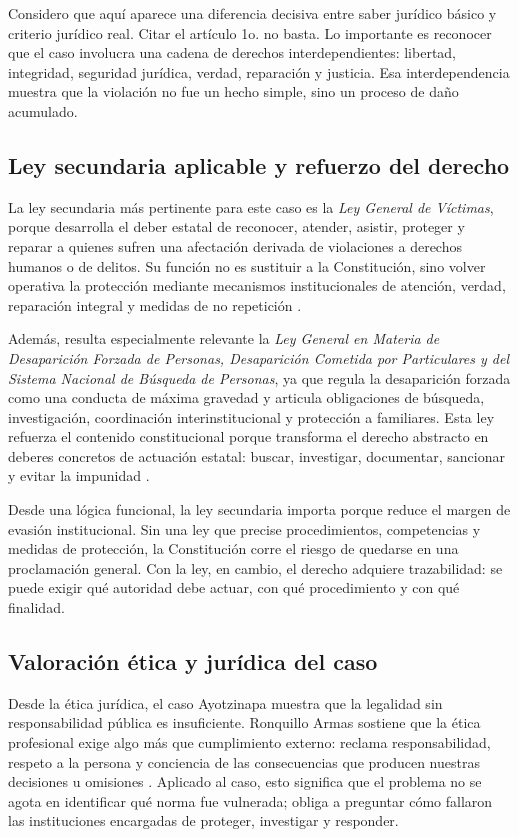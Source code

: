 \documentclass[
	spanish,
	letterpaper, oneside
]{article}
\begin{document}
Considero que aquí aparece una diferencia decisiva entre saber jurídico básico y criterio jurídico real. Citar el artículo 1o. no basta. Lo importante es reconocer que el caso involucra una cadena de derechos interdependientes: libertad, integridad, seguridad jurídica, verdad, reparación y justicia. Esa interdependencia muestra que la violación no fue un hecho simple, sino un proceso de daño acumulado.

\subsection{Ley secundaria aplicable y refuerzo del derecho}

La ley secundaria más pertinente para este caso es la \textit{Ley General de Víctimas}, porque desarrolla el deber estatal de reconocer, atender, asistir, proteger y reparar a quienes sufren una afectación derivada de violaciones a derechos humanos o de delitos. Su función no es sustituir a la Constitución, sino volver operativa la protección mediante mecanismos institucionales de atención, verdad, reparación integral y medidas de no repetición \citep{lgv2026}.

Además, resulta especialmente relevante la \textit{Ley General en Materia de Desaparición Forzada de Personas, Desaparición Cometida por Particulares y del Sistema Nacional de Búsqueda de Personas}, ya que regula la desaparición forzada como una conducta de máxima gravedad y articula obligaciones de búsqueda, investigación, coordinación interinstitucional y protección a familiares. Esta ley refuerza el contenido constitucional porque transforma el derecho abstracto en deberes concretos de actuación estatal: buscar, investigar, documentar, sancionar y evitar la impunidad \citep{lgmdfp2026}.

Desde una lógica funcional, la ley secundaria importa porque reduce el margen de evasión institucional. Sin una ley que precise procedimientos, competencias y medidas de protección, la Constitución corre el riesgo de quedarse en una proclamación general. Con la ley, en cambio, el derecho adquiere trazabilidad: se puede exigir qué autoridad debe actuar, con qué procedimiento y con qué finalidad.

\subsection{Valoración ética y jurídica del caso}

Desde la ética jurídica, el caso Ayotzinapa muestra que la legalidad sin responsabilidad pública es insuficiente. Ronquillo Armas sostiene que la ética profesional exige algo más que cumplimiento externo: reclama responsabilidad, respeto a la persona y conciencia de las consecuencias que producen nuestras decisiones u omisiones \citep{ronquilloarmasEticaGeneralProfesional2018}. Aplicado al caso, esto significa que el problema no se agota en identificar qué norma fue vulnerada; obliga a preguntar cómo fallaron las instituciones encargadas de proteger, investigar y responder.
\end{document}
